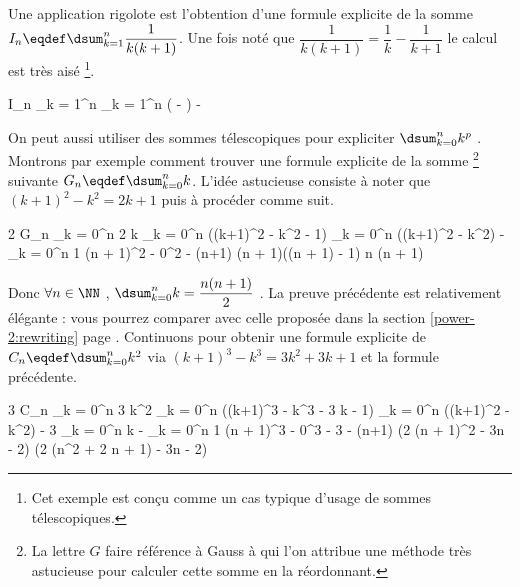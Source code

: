 Une application rigolote est l'obtention d'une formule explicite de la somme $I_n \eqdef \dsum_{k = 1}^{n} \dfrac{1}{k(k+1)}$. 
Une fois noté que $\dfrac{1}{k(k+1)} = \dfrac{1}{k} -  \dfrac{1}{k+1}$
le calcul est très aisé
\footnote{
	Cet exemple est conçu comme un cas typique d'usage de sommes télescopiques.
}.

\medskip

\begin{explain}[style = sar]
	I_n \explnext[\eqdef]{}
	\dsum_{k = 1}^{n} 
		\explnext{}
	\dsum_{k = 1}^{n} \left(  -  \right)
	 - 
		\explnext{}
\end{explain}


\bigskip

On peut aussi utiliser des sommes télescopiques pour expliciter $\dsum_{k = 0}^{n} k^p$ .
Montrons par exemple comment trouver une formule explicite de la somme
\footnote{
	La lettre $G$ faire référence à Gauss à qui l'on attribue une méthode très astucieuse pour calculer cette somme en la réordonnant.
}
suivante $G_n \eqdef \dsum_{k = 0}^{n} k$.
L'idée astucieuse consiste à noter que $(k+1)^2 - k^2 = 2 k + 1$ puis à procéder comme suit.

\medskip

\begin{explain}[style = sar]
	2 G_n
		\explnext{}
	\dsum_{k = 0}^{n} 2 k
		\explnext{}
	\dsum_{k = 0}^{n} ((k+1)^2 - k^2 - 1)
		\explnext{}
	\dsum_{k = 0}^{n} ((k+1)^2 - k^2) - \dsum_{k = 0}^{n} 1
	(n + 1)^2 - 0^2 - (n+1)
		\explnext{}
	(n + 1)((n + 1) - 1)
		\explnext{}
	n (n + 1)
\end{explain}

\bigskip

Donc
$\forall n \in \NN$ , $\dsum_{k = 0}^{n} k = \dfrac{n(n + 1)}{2}$ .
La preuve précédente est relativement élégante : vous pourrez comparer avec celle proposée dans la section \ref{power-2:rewriting} page \pageref{power-2:rewriting}.
Continuons pour obtenir une formule explicite de
$C_n \eqdef \dsum_{k = 0}^{n} k^2$
via $(k+1)^3 - k^3 = 3 k^2 + 3 k + 1$
et la formule précédente.

\medskip

\begin{explain}[style = sar]
	3 C_n
		\explnext{}
	\dsum_{k = 0}^{n} 3 k^2
		\explnext{}
	\dsum_{k = 0}^{n} ((k+1)^3 - k^3 - 3 k - 1)
		\explnext{}
	\dsum_{k = 0}^{n} ((k+1)^2 - k^2) - 3 \dsum_{k = 0}^{n} k - \dsum_{k = 0}^{n} 1
	(n + 1)^3 - 0^3 - 3 \cdot {} - (n+1)
		\explnext{}
	 \left[ \, 2 (n + 1)^3 - 3n (n + 1) - 2(n+1) \, \right]
		\explnext{}
	 \cdot (2 (n + 1)^2 - 3n - 2)
		\explnext{}
	 \cdot (2 (n^2 + 2 n + 1) - 3n - 2)
		\explnext{}
		\explnext{}
\end{explain}


